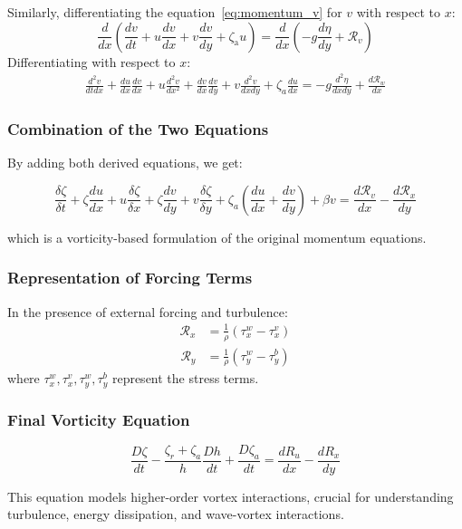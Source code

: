 \documentclass[12pt]{article}
\begin{document}
    Similarly, differentiating the equation~\ref{eq:momentum_v} for $v$ with respect to $x$:
    \begin{equation*}
        \frac{d}{dx} \left( \frac{d v}{d t}+u \frac{d v}{d x}+v \frac{d v}{d y}+\zeta_{\text {a}} u \right) =  \frac{d}{dx} \left( -g
                                                                                                                                 \frac{d \eta}{d y}+\mathcal{R}_v \right)
        \label{eq:diff_v_to_x}
    \end{equation*}
    Differentiating with respect to $x$:
    \begin{align}
        \frac{d^2 v}{d t d x}+\frac{d u}{d x} \frac{d v}{d x}+u \frac{d^2 v}{d x^2}+\frac{d v}{d x} \frac{d v}{d y}+v \frac{d^2 v}{d x d y}+\zeta_a \frac{d u}{d x}=-g \frac{d^2 \eta}{d x d y}+\frac{d \mathcal{R}_w}{d x}
    \end{align}

    \subsubsection*{Combination of the Two Equations}
    By adding both derived equations, we get:
    \begin{eqbox}
        \begin{equation}
        \frac{\delta \zeta}{\delta t}+\zeta \frac{d u}{d x}+u \frac{\delta \zeta}{\delta x}+\zeta \frac{d v}{d y}+v \frac{\delta \zeta}{\delta y}+\zeta_a\left(\frac{d u}{d x}+\frac{d v}{d y}\right)+\beta v=\frac{d \mathcal{R}_v}{d x}-\frac{d \mathcal{R}_x}{d y}
        \end{equation}
    \end{eqbox}
    which is a vorticity-based formulation of the original momentum equations.

    \subsubsection*{Representation of Forcing Terms}
    In the presence of external forcing and turbulence:
    \begin{align}
        \mathcal{R}_x &= \frac{1}{\rho}(\tau_x^w - \tau_x^v)
    \end{align}
    \begin{align}
        \mathcal{R}_y &= \frac{1}{\rho}(\tau_y^w - \tau_y^b)
    \end{align}
    where $\tau_x^w, \tau_x^v, \tau_y^w, \tau_y^b$ represent the stress terms.

    \subsubsection{Final Vorticity Equation}
    \begin{eqbox}
        \begin{equation}
        \frac{D \zeta}{d t}-\frac{\zeta_r+\zeta_a}{h} \frac{D h}{d t}+\frac{D \zeta_a}{d t}=\frac{d R_u}{d x}-\frac{d R_x}{d y}
        \end{equation}
    \end{eqbox}
    This equation models higher-order vortex interactions, crucial for understanding turbulence, energy dissipation, and wave-vortex interactions.
\end{document}
